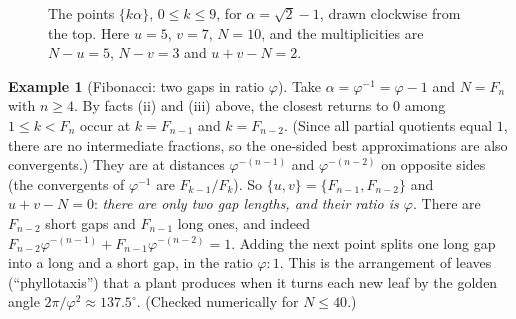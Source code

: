 \documentclass[11pt,openany]{book}
\theoremstyle{plain}
\theoremstyle{definition}
\newtheorem{example}[theorem]{Example}
\theoremstyle{remark}
\begin{document}
\begin{figure}[ht]
\centering
{}
\caption{The points $\{k\alpha\}$, $0\le k\le9$, for $\alpha=\sqrt2-1$, drawn clockwise from the top.
Here $u=5$, $v=7$, $N=10$, and the multiplicities are $N-u=5$, $N-v=3$ and $u+v-N=2$.}
\label{ERG:fig:threegap}
\end{figure}

\begin{example}[Fibonacci: two gaps in ratio $\varphi$]\label{ERG:ex:fibgaps}
Take $\alpha=\varphi^{-1}=\varphi-1$ and $N=F_n$ with $n\ge4$. By facts (ii) and (iii) above, the
closest returns to $0$ among $1\le k<F_n$ occur at $k=F_{n-1}$ and $k=F_{n-2}$. (Since all partial
quotients equal $1$, there are no intermediate fractions, so the one-sided best approximations are also
convergents.) They are at distances
$\varphi^{-(n-1)}$ and $\varphi^{-(n-2)}$ on opposite sides (the convergents of $\varphi^{-1}$ are
$F_{k-1}/F_k$). So $\{u,v\}=\{F_{n-1},F_{n-2}\}$ and $u+v-N=0$: \emph{there are only two gap lengths,
and their ratio is $\varphi$}. There are $F_{n-2}$ short gaps and $F_{n-1}$ long ones, and indeed
$F_{n-2}\varphi^{-(n-1)}+F_{n-1}\varphi^{-(n-2)}=1$. Adding the next point splits one long gap into a
long and a short gap, in the ratio $\varphi:1$. This is the arrangement of leaves (``phyllotaxis'') that
a plant produces when it turns each new leaf by the golden angle $2\pi/\varphi^2\approx137.5^\circ$.
(Checked numerically for $N\le40$.)
\end{example}
\end{document}
